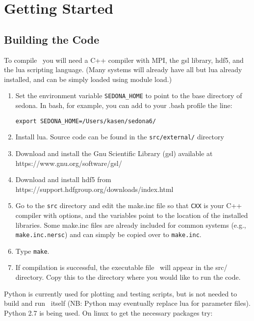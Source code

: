 
\chapter{Getting Started}

\section{Building the Code}


To compile \sedona\ you will need a C++ compiler with MPI, the gsl library, hdf5, and the lua scripting language.
(Many systems will already have all but lua already installed, and can be simply loaded using module load.)

\begin{enumerate}


\item Set the environment variable {\tt SEDONA\_HOME} to point to the base directory of sedona. In bash, for example, you
can add to your .bash profile the line: 
\begin{verbatim}
export SEDONA_HOME=/Users/kasen/sedona6/
\end{verbatim}


\item Install lua. Source code can be found in the {\tt src/external/} directory

\item Download and install the Gnu Scientific Library (gsl) available at https://www.gnu.org/software/gsl/

\item Download and install hdf5 from https://support.hdfgroup.org/downloads/index.html

\item Go to the {\tt src} directory and edit the make.inc file so that {\tt CXX} is your C++ compiler with options, and the variables point to the  location of the installed libraries. Some make.inc files are already included for common systems (e.g., {\tt make.inc.nersc}) and can simply be copied over to {\tt make.inc}.

\item Type {\tt make}.

\item If compilation is successful, the executable file \executable\ will appear in the src/ directory. Copy this to the directory where you would like to run the code.


\end{enumerate}


Python is currently used for plotting and testing scripts, but is not needed to build and run \sedona\ itself (NB: Python may
eventually replace lua for parameter files). Python 2.7 is being used. On linux to get the necessary packages try:

